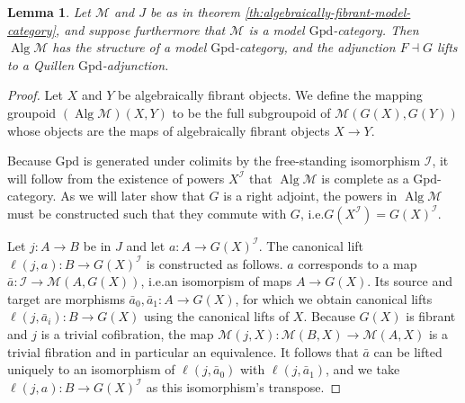 \documentclass[a4paper]{article}
\newtheorem{lemma}[theorem]{Lemma}
\theoremstyle{remark}
\theoremstyle{definition}
\begin{document}
\begin{lemma}
  \label{lem:algebraically-fibrant-lproper-simplicial}
  Let $\mathcal{M}$ and $J$ be as in theorem \ref{th:algebraically-fibrant-model-category}, and suppose furthermore that $\mathcal{M}$ is a model $\mathrm{Gpd}$-category.
  Then $\operatorname{Alg} \mathcal{M}$ has the structure of a model $\mathrm{Gpd}$-category, and the adjunction $F \dashv G$ lifts to a Quillen $\mathrm{Gpd}$-adjunction.
\end{lemma}
\begin{proof}
  Let $X$ and $Y$ be algebraically fibrant objects.
  We define the mapping groupoid $(\operatorname{Alg} \mathcal{M})(X, Y)$ to be the full subgroupoid of $\mathcal{M}(G(X), G(Y))$ whose objects are the maps of algebraically fibrant objects $X \rightarrow Y$.

  Because $\mathrm{Gpd}$ is generated under colimits by the free-standing isomorphism $\mathcal{I}$, it will follow from the existence of powers $X^\mathcal{I}$ that $\operatorname{Alg} \mathcal{M}$ is complete as a $\mathrm{Gpd}$-category.
  As we will later show that $G$ is a right adjoint, the powers in $\operatorname{Alg} \mathcal{M}$ must be constructed such that they commute with $G$, i.e.\@ $G(X^\mathcal{I}) = G(X)^\mathcal{I}$.

  Let $j : A \rightarrow B$ be in $J$ and let $a : A \rightarrow G(X)^\mathcal{I}$.
  The canonical lift $\ell(j, a) : B \rightarrow G(X)^\mathcal{I}$ is constructed as follows.
  $a$ corresponds to a map $\bar a : \mathcal{I} \rightarrow \mathcal{M}(A, G(X))$, i.e.\@ an isomorpism of maps $A \rightarrow G(X)$.
  Its source and target are morphisms $\bar a_0, \bar a_1 : A \rightarrow G(X)$, for which we obtain canonical lifts $\ell(j, \bar a_i) : B \rightarrow G(X)$ using the canonical lifts of $X$.
  Because $G(X)$ is fibrant and $j$ is a trivial cofibration, the map $\mathcal{M}(j, X) : \mathcal{M}(B, X) \rightarrow \mathcal{M}(A, X)$ is a trivial fibration and in particular an equivalence.
  It follows that $\bar a$ can be lifted uniquely to an isomorphism of $\ell(j, \bar a_0)$ with $\ell(j, \bar a_1)$, and we take $\ell(j, a) : B \rightarrow G(X)^\mathcal{I}$ as this isomorphism's transpose.


\end{proof}
\end{document}

